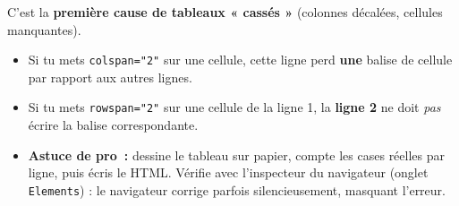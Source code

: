\documentclass[11pt]{article}
\begin{document}
\begin{attention}
C'est la \textbf{première cause de tableaux « cassés »} (colonnes décalées, cellules manquantes).
\begin{itemize}
    \item Si tu mets \texttt{colspan="2"} sur une cellule, cette ligne perd \textbf{une} balise de cellule par rapport aux autres lignes.
    \item Si tu mets \texttt{rowspan="2"} sur une cellule de la ligne 1, la \textbf{ligne 2} ne doit \emph{pas} écrire la balise correspondante.
    \item \textbf{Astuce de pro~:} dessine le tableau sur papier, compte les cases réelles par ligne, puis écris le HTML. Vérifie avec l'inspecteur du navigateur (onglet \texttt{Elements}) : le navigateur corrige parfois silencieusement, masquant l'erreur.
\end{itemize}
\end{attention}
\end{document}

